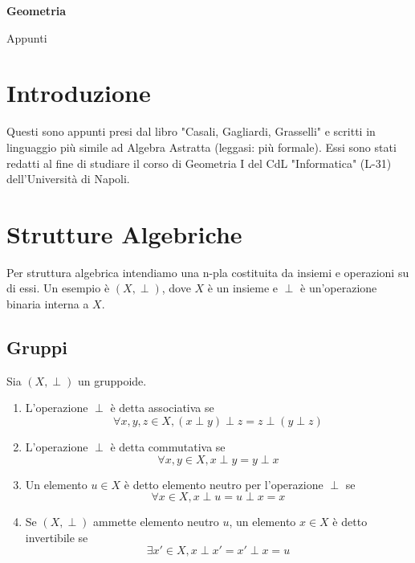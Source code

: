 \documentclass[11pt,a4paper]{article}
\theoremstyle{manuale}
\theoremstyle{manualecorsivo}
\begin{document}
	
	\begin{center}
		
		{\LARGE\bfseries Geometria}
		
		\vspace{0.3cm}
		
		{\large Appunti}
		
		\vspace{0.2cm}
		
	\end{center}
	
	\vspace{0.5cm}
	
	\tableofcontents
	
	\newpage
	
	
	\section{Introduzione}
	
	Questi sono appunti presi dal libro "Casali, Gagliardi, Grasselli" e scritti in linguaggio più simile ad Algebra Astratta (leggasi: più formale). Essi sono stati redatti al fine di studiare il corso di Geometria I del CdL "Informatica" (L-31) dell'Università di Napoli.
	
	\section{Strutture Algebriche}
	Per struttura algebrica intendiamo una n-pla costituita da insiemi e operazioni su di essi.
	Un esempio è $(X, \perp)$, dove $X$ è un insieme e $\perp$ è un'operazione binaria interna a $X$.
	
	\subsection{Gruppi}
	Sia $(X, \perp)$ un gruppoide.
	
	\begin{enumerate}[label=\roman*)]
		\item L'operazione $\perp$ è detta associativa se
		$$\forall x,y,z \in X, (x \perp y) \perp z = z \perp (y \perp z)$$
		
		\item L'operazione $\perp$ è detta commutativa se
		$$ \forall x,y \in X, x \perp y = y \perp x $$
		
		\item Un elemento $u \in X$ è detto elemento neutro per l'operazione $\perp$ se
		$$ \forall x \in X, x \perp u = u \perp x = x $$ 
		
		\item Se $(X, \perp)$ ammette elemento neutro $u$, un elemento $x \in X$ è detto invertibile se
		$$ \exists x' \in X, x \perp x' = x' \perp x = u $$
	\end{enumerate}
	
\end{document}
